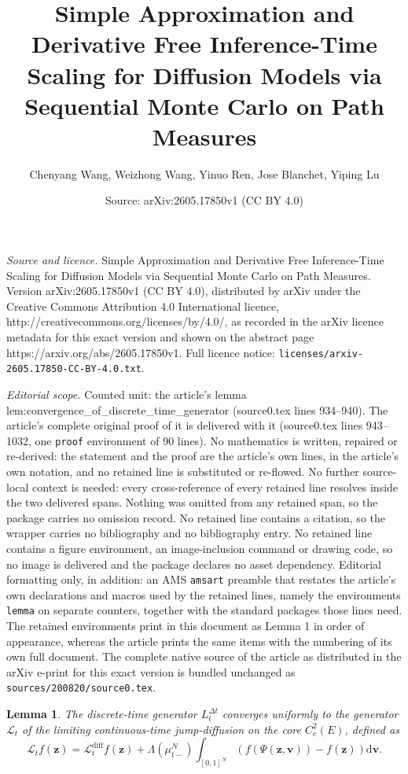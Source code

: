 \documentclass[10pt,a4paper]{amsart}
\title{Simple Approximation and Derivative Free Inference-Time Scaling for Diffusion Models via Sequential Monte Carlo on Path Measures}
\author{Chenyang Wang, Weizhong Wang, Yinuo Ren, Jose Blanchet, Yiping Lu}
\date{Source: arXiv:2605.17850v1 (CC BY 4.0)}
\newtheorem{lemma}{Lemma}
\newcommand{\mathbbm}[1]{\boldsymbol{#1}}
\begin{document}
\maketitle

\noindent\emph{Source and licence.} Simple Approximation and Derivative Free Inference-Time Scaling for Diffusion Models via Sequential Monte Carlo on Path Measures. Version arXiv:2605.17850v1 (CC BY 4.0), distributed by arXiv under the Creative Commons Attribution 4.0 International licence, http://creativecommons.org/licenses/by/4.0/, as recorded in the arXiv licence metadata for this exact version and shown on the abstract page https://arxiv.org/abs/2605.17850v1. Full licence notice: \texttt{licenses/arxiv-2605.17850-CC-BY-4.0.txt}.\par\smallskip

\noindent\textit{Editorial scope.} Counted unit: the article's lemma lem:convergence\_of\_discrete\_time\_generator (source0.tex lines 934--940). The article's complete original proof of it is delivered with it (source0.tex lines 943--1032, one \texttt{proof} environment of 90 lines). No mathematics is written, repaired or re-derived: the statement and the proof are the article's own lines, in the article's own notation, and no retained line is substituted or re-flowed.  No further source-local context is needed: every cross-reference of every retained line resolves inside the two delivered spans.  Nothing was omitted from any retained span, so the package carries no omission record.  No retained line contains a citation, so the wrapper carries no bibliography and no bibliography entry.  No retained line contains a figure environment, an image-inclusion command or drawing code, so no image is delivered and the package declares no asset dependency.  Editorial formatting only, in addition: an AMS \texttt{amsart} preamble that restates the article's own declarations and macros used by the retained lines, namely the environments \texttt{lemma} on separate counters, together with the standard packages those lines need.  The retained environments print in this document as Lemma 1 in order of appearance, whereas the article prints the same items with the numbering of its own full document.  The complete native source of the article as distributed in the arXiv e-print for this exact version is bundled unchanged as \texttt{sources/200820/source0.tex}.
\begin{lemma}
The discrete-time generator $L^{\Delta t}_t$ converges uniformly to the generator $\mathcal{L}_t$ of the limiting continuous-time jump-diffusion on the core $C_c^2(E)$, defined as 
\begin{equation*}
    \mathcal{L}_t f(\mathbbm{z}) = \mathcal{L}^{\text{diff}}_t f(\mathbbm{z}) + \Lambda(\mu^N_{t-}) \int_{[0,1]^N} \left( f(\Psi(\mathbbm{z}, \mathbbm{v})) - f(\mathbbm{z}) \right)  \mathrm{d}\mathbbm{v}.
\end{equation*}
\label{lem:convergence_of_discrete_time_generator}
\end{lemma}
\end{document}
